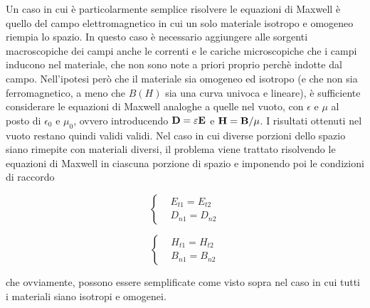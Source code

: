 Un caso in cui è particolarmente semplice risolvere le equazioni di Maxwell è quello del
campo elettromagnetico in cui un solo materiale isotropo e omogeneo riempia lo spazio.
In questo caso è necessario aggiungere alle sorgenti macroscopiche dei campi
anche le correnti e le cariche microscopiche che i campi inducono nel materiale, che non sono note a priori proprio perchè
indotte dal campo. Nell'ipotesi però che il materiale sia omogeneo ed isotropo (e che non sia ferromagnetico, a meno che
$B(H)$ sia una curva univoca e lineare),
è sufficiente considerare le equazioni di Maxwell analoghe a quelle nel vuoto, con $\epsilon$ e $\mu$
al posto di $\epsilon_0$ e $\mu_0$, ovvero introducendo $\vb{D}=\varepsilon \vb{E}$  e $\vb{H}=\vb{B}/\mu$.
I risultati ottenuti nel vuoto restano quindi validi validi.
Nel caso in cui diverse porzioni dello spazio siano rimepite con materiali diversi,
il problema viene trattato risolvendo le equazioni di Maxwell in ciascuna porzione di spazio e imponendo poi le condizioni di raccordo

\begin{minipage}[t]{0.5\textwidth}
    \[
        \begin{cases}
            & E_{t1}=E_{t2}\\
            & D_{n1}=D_{n2}
        \end{cases}
    \]
\end{minipage}
\begin{minipage}[t]{0.5\textwidth}
    \[
        \begin{cases}
            & H_{t1}=H_{t2}\\
            & B_{n1}=B_{n2}
        \end{cases}
    \]
\end{minipage}
che ovviamente, possono essere semplificate come visto sopra nel caso in cui tutti i materiali siano isotropi e omogenei.

